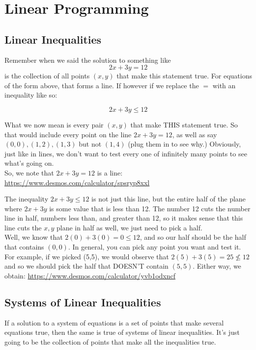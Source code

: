 
\chapter{Linear Programming}\label{Chapter:LinearProgramming}


\section{Linear Inequalities}\label{Section:LinearInequalities}

Remember when we said the solution to something like $$2x+3y=12$$ is the collection of all points $(x,y)$ that make this statement true.  For equations of the form above, that forms a line.  If however if we replace the $=$ with an inequality like so:

$$2x+3y\leq12$$

What we now mean is every pair $(x,y)$ that make THIS statement true.  So that would include every point on the line $2x+3y=12$, as well as say $(0,0), (1,2), (1,3)$ but not $(1,4)$ (plug them in to see why.)  Obviously, just like in lines, we don't want to test every one of infinitely many points to see what's going on.\\

So, we note that $2x+3y=12$ is a line:  \url{https://www.desmos.com/calculator/spsryp8xxl}

The inequality $2x+3y\leq12$ is not just this line, but the entire half of the plane where $2x+3y$ is some value that is less than 12.  The number 12 cuts the number line in half, numbers less than, and greater than 12, so it makes sense that this line cuts the $x,y$ plane in half as well, we just need to pick a half.\\

Well, we know that $2(0)+3(0)=0\leq12$, and so our half should be the half that contains $(0,0)$.  In general, you can pick any point you want and test it.  For example, if we picked (5,5), we would observe that $2(5)+3(5)=25\not\leq 12$ and so we should pick the half that DOESN'T contain $(5,5)$.  Either way, we obtain: \url{https://www.desmos.com/calculator/yvb1odxncf}


\section{Systems of Linear Inequalities}\label{Section:SystemsLinearInequalities}

If a solution to a system of equations is a set of points that make several equations true, then the same is true of systems of linear inequalities.  It's just going to be the collection of points that make all the inequalities true.


